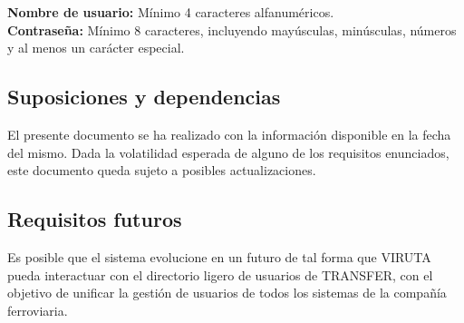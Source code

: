 \textbf{Nombre de usuario:} Mínimo 4 caracteres alfanuméricos.\\

\textbf{Contraseña:} Mínimo 8 caracteres, incluyendo mayúsculas, minúsculas, números y al menos un carácter especial.

\subsection{Suposiciones y dependencias}

El presente documento se ha realizado con la información disponible en la fecha del mismo. Dada la volatilidad esperada de alguno de los requisitos enunciados, este documento queda sujeto a posibles actualizaciones.

\subsection{Requisitos futuros}

Es posible que el sistema evolucione en un futuro de tal forma que VIRUTA pueda interactuar con el directorio ligero de usuarios de TRANSFER, con el objetivo de unificar la gestión de usuarios de todos los sistemas de la compañía ferroviaria.\\